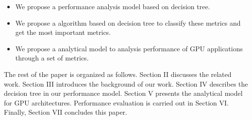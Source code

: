 \begin{itemize}

\item We propose a performance analysis model based on decision tree.

\item We propose a algorithm based on decision tree to classify these metrics and get the most important metrics.

\item We propose a analytical model to analysis performance of GPU applications through a set of metrics.

\end{itemize}

The rest of the paper is organized as follows. Section II discusses the related work. Section III introduces the background of our work. Section IV describes the decision tree in our performance model. Section V presents the analytical model for GPU architectures. Performance evaluation is carried out in Section VI. Finally, Section VII concludes this paper.